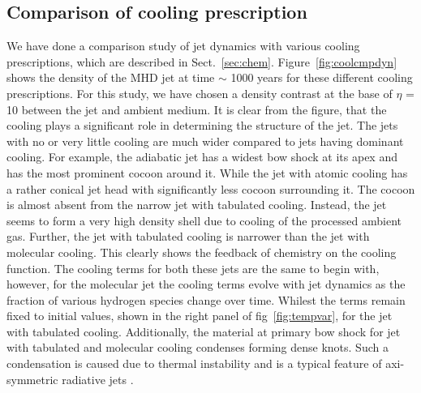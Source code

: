 \documentclass[useAMS,usenatbib,letters]{mn2e}
\begin{document}
\subsection{Comparison of cooling prescription}
\label{ssec:coolres}
We have done a comparison study of jet dynamics with various cooling
prescriptions, which are described in
Sect.~\ref{sec:chem}. Figure~\ref{fig:coolcmpdyn} shows the density of the MHD
jet at time $\sim$ 1000 years for these different cooling
prescriptions. For this study, we have chosen a density contrast at the base of
$\eta$ = 10 between the jet and ambient medium.
It is clear from the figure, that the cooling plays a
significant role in determining the structure of the jet. The jets
with no or very little cooling are much wider compared to
jets having dominant cooling. For example, the adiabatic jet
has a widest bow shock at its apex and has the most prominent cocoon
around it. While the jet with atomic cooling has a rather conical
jet head with significantly less cocoon surrounding it. The cocoon is
almost absent from the narrow jet with tabulated cooling. Instead, the jet
seems to form a very high density shell due to cooling of the
processed ambient gas. Further, the jet with tabulated cooling is narrower than the jet with molecular cooling. This clearly
shows the feedback of chemistry on the cooling function. The cooling
terms for both these jets are the same to begin with, however,
for the molecular jet the cooling terms evolve with jet dynamics as the fraction of
various hydrogen species change over time. Whilest the terms remain fixed to initial values, shown in the right panel of fig~\ref{fig:tempvar}, for the jet with tabulated
cooling. Additionally, the material at primary bow shock for jet
with tabulated and molecular cooling condenses forming dense knots. 
Such a condensation is caused due to thermal instability and is 
a typical feature of axi-symmetric radiative jets 
\citep[see, for e.g,][]{Blondin:1990p2130,Cerqueira:1999p15052}.
%
\end{document}
